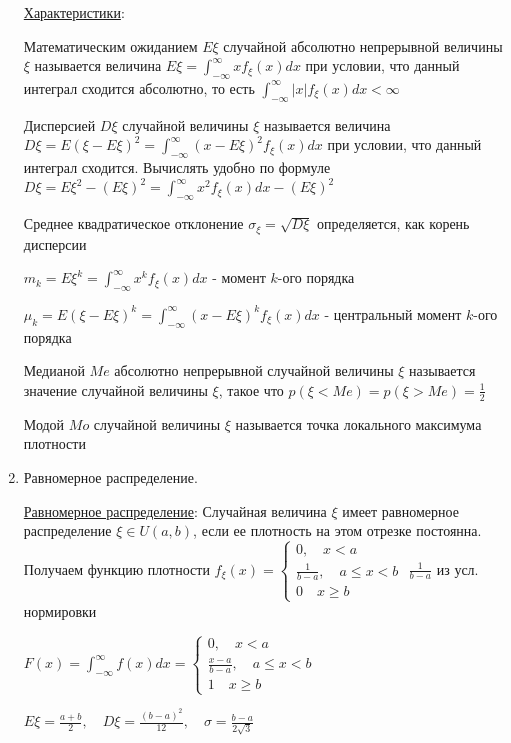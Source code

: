 \documentclass[12pt]{article}
\begin{document}
\begin{enumerate}
    \hyperlink{attributesofcontinuousrandomvariable}{Характеристики}:

    Математическим ожиданием $E\xi$ случайной абсолютно непрерывной величины $\xi$ называется величина $E\xi = \int_{-\infty}^{\infty} xf_\xi(x) dx$ 
    при условии, что данный интеграл сходится абсолютно, то есть $\int_{-\infty}^\infty |x|f_\xi(x)dx < \infty$

    Дисперсией $D\xi$ случайной величины $\xi$ называется величина $D\xi = E(\xi - E\xi)^2 = \int_{-\infty}^\infty (x - E\xi)^2 f_\xi(x) dx$ при условии,
    что данный интеграл сходится. Вычислять удобно по формуле $D\xi = E\xi^2 - (E\xi)^2 = \int_{-\infty}^\infty x^2 f_\xi(x)dx - (E\xi)^2$

    Среднее квадратическое отклонение $\sigma_\xi = \sqrt{D\xi}$ определяется, как корень дисперсии

    $m_k = E\xi^k = \int_{-\infty}^\infty x^k f_\xi(x)dx$ - момент $k$-ого порядка

    $\mu_k = E(\xi - E\xi)^k = \int_{-\infty}^\infty (x - E\xi)^k f_\xi(x)dx$ - центральный момент $k$-ого порядка
    
    Медианой $Me$ абсолютно непрерывной случайной величины $\xi$ называется значение случайной величины $\xi$, такое что $p(\xi < Me) = p(\xi > Me) = \frac{1}{2}$
    
    Модой $Mo$ случайной величины $\xi$ называется точка локального максимума плотности

    \item Равномерное распределение. 

    \hyperlink{uniformdistribution}{Равномерное распределение}: Случайная величина $\xi$ имеет равномерное распределение $\xi \in U(a, b)$, если ее плотность
    на этом отрезке постоянна. Получаем функцию плотности $f_\xi(x) = \begin{cases}0, \quad x < a \\ \frac{1}{b - a}, \quad a \leq x < b \\ 0 \quad x \geq b\end{cases}$ \hfill {\scriptsize $\frac{1}{b - a}$ из усл. нормировки}

    $F(x) = \int_{-\infty}^\infty f(x)dx = \begin{cases}0, \quad x < a \\ \frac{x - a}{b - a}, \quad a \leq x < b \\ 1 \quad x \geq b\end{cases}$

    $E\xi = \frac{a + b}{2}, \quad D\xi = \frac{(b - a)^2}{12}, \quad \sigma = \frac{b - a}{2\sqrt{3}}$


\end{enumerate}
\end{document}
